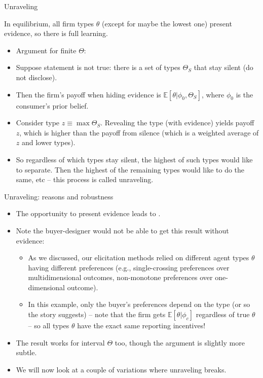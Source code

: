 \documentclass[english,10pt
,aspectratio=169
]{beamer}
\begin{document}
\begin{frame}{Unraveling}
	\begin{theorem}[Unraveling]
		In equilibrium, all firm types $\theta$ (except for maybe the lowest one) present evidence, so there is full learning.
	\end{theorem}
	\begin{itemize}[<+->]
		\item Argument for finite $\Theta$:
		\item Suppose statement is not true: there is a set of types $\Theta_S$ that stay silent (do not disclose).
		\item Then the firm's payoff when hiding evidence is $\mathbb{E}[\theta | \phi_0, \Theta_S]$, where $\phi_0$ is the consumer's prior belief.
		\item Consider type $z \equiv \max \Theta_S$. Revealing the type (with evidence) yields payoff $z$, which is higher than the payoff from silence (which is a weighted average of $z$ and lower types).
		\item So regardless of which types stay silent, the highest of such types would like to separate. Then the highest of the remaining types would like to do the same, etc -- this process is called \alert{unraveling}.
	\end{itemize}
\end{frame}


\begin{frame}{Unraveling: reasons and robustness}
	\begin{itemize}
		\item The opportunity to present evidence leads to .
		\item Note the buyer-designer would \alert{not be able} to get this result \alert{without evidence}:
		\begin{itemize}
			\item As we discussed, our elicitation methods relied on different agent types $\theta$ having different preferences (e.g., single-crossing preferences over multidimensional outcomes, non-monotone preferences over one-dimensional outcome).
			
			\item In this example, only the buyer's preferences depend on the type (or so the story suggests) -- note that the firm gets $\mathbb{E}[\theta | \phi_c]$ regardless of true $\theta$ -- so all types $\theta$ have the exact same reporting incentives! 
		\end{itemize}
		\pause
		\item The result works for interval $\Theta$ too, though the argument is slightly more subtle. 
		\item We will now look at a couple of variations where unraveling \alert{breaks}.
	\end{itemize}
\end{frame}
\end{document}
